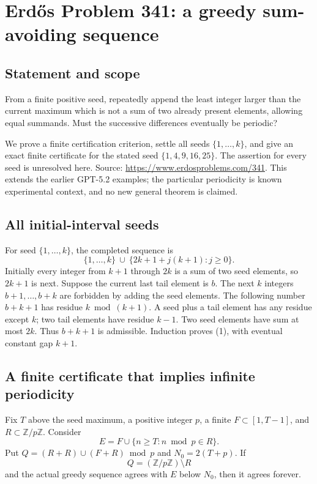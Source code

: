 \section*{Erd\H{o}s Problem 341: a greedy sum-avoiding sequence}
\subsection*{Statement and scope}
From a finite positive seed, repeatedly append the least integer larger than the current maximum which is not a sum of two already present elements, allowing equal summands. Must the successive differences eventually be periodic?

We prove a finite certification criterion, settle all seeds $\{1,\ldots,k\}$, and give an exact finite certificate for the stated seed $\{1,4,9,16,25\}$. The assertion for every seed is unresolved here. Source: \url{https://www.erdosproblems.com/341}. This extends the earlier GPT-5.2 examples; the particular periodicity is known experimental context, and no new general theorem is claimed.

\subsection*{All initial-interval seeds}
For seed $\{1,\ldots,k\}$, the completed sequence is
\[
 \{1,\ldots,k\}\ \cup\ \{2k+1+j(k+1):j\ge0\}. \tag{1}
\]
Initially every integer from $k+1$ through $2k$ is a sum of two seed elements, so $2k+1$ is next. Suppose the current last tail element is $b$. The next $k$ integers $b+1,\ldots,b+k$ are forbidden by adding the seed elements. The following number $b+k+1$ has residue $k\bmod(k+1)$. A seed plus a tail element has any residue except $k$; two tail elements have residue $k-1$. Two seed elements have sum at most $2k$. Thus $b+k+1$ is admissible. Induction proves (1), with eventual constant gap $k+1$.

\subsection*{A finite certificate that implies infinite periodicity}
Fix $T$ above the seed maximum, a positive integer $p$, a finite $F\subset[1,T-1]$, and $R\subset\mathbb Z/p\mathbb Z$. Consider
\[
 E=F\cup\{n\ge T:n\bmod p\in R\}.
\]
Put $Q=(R+R)\cup(F+R)\bmod p$ and $N_0=2(T+p)$. If
\[
 Q=(\mathbb Z/p\mathbb Z)\setminus R \tag{2}
\]
and the actual greedy sequence agrees with $E$ below $N_0$, then it agrees forever.

